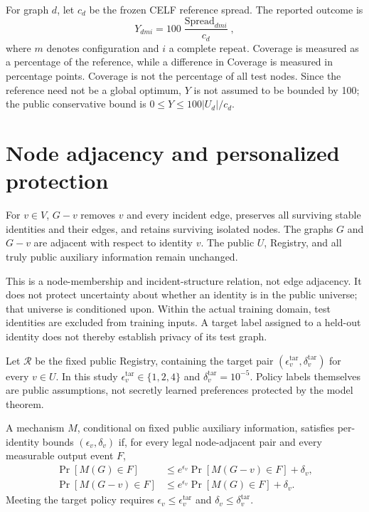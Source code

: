 For graph $d$, let $c_d$ be the frozen CELF reference spread. The reported outcome is
\begin{equation}
 Y_{dmi}=100\frac{\operatorname{Spread}_{dmi}}{c_d},\label{eq:coverage}
\end{equation}
where $m$ denotes configuration and $i$ a complete repeat. Coverage is measured as a percentage of the reference, while a difference in Coverage is measured in percentage points. Coverage is not the percentage of all test nodes. Since the reference need not be a global optimum, $Y$ is not assumed to be bounded by 100; the public conservative bound is $0\leq Y\leq100|U_d|/c_d$.

\section{Node adjacency and personalized protection}
\begin{definition}
For $v\in V$, $G-v$ removes $v$ and every incident edge, preserves all surviving stable identities and their edges, and retains surviving isolated nodes. The graphs $G$ and $G-v$ are adjacent with respect to identity $v$. The public $U$, Registry, and all truly public auxiliary information remain unchanged.
\end{definition}

This is a node-membership and incident-structure relation, not edge adjacency. It does not protect uncertainty about whether an identity is in the public universe; that universe is conditioned upon. Within the actual training domain, test identities are excluded from training inputs. A target label assigned to a held-out identity does not thereby establish privacy of its test graph.

Let $\mathcal{R}$ be the fixed public Registry, containing the target pair $(\epsilon^{\mathrm{tar}}_v,\delta^{\mathrm{tar}}_v)$ for every $v\in U$. In this study $\epsilon^{\mathrm{tar}}_v\in\{1,2,4\}$ and $\delta^{\mathrm{tar}}_v=10^{-5}$. Policy labels themselves are public assumptions, not secretly learned preferences protected by the model theorem.

\begin{definition}
A mechanism $M$, conditional on fixed public auxiliary information, satisfies per-identity bounds $(\epsilon_v,\delta_v)$ if, for every legal node-adjacent pair and every measurable output event $F$,
\begin{align}
 \Pr[M(G)\in F]&\leq e^{\epsilon_v}\Pr[M(G-v)\in F]+\delta_v,\\
 \Pr[M(G-v)\in F]&\leq e^{\epsilon_v}\Pr[M(G)\in F]+\delta_v.
\end{align}
Meeting the target policy requires $\epsilon_v\leq\epsilon^{\mathrm{tar}}_v$ and $\delta_v\leq\delta^{\mathrm{tar}}_v$.
\end{definition}

